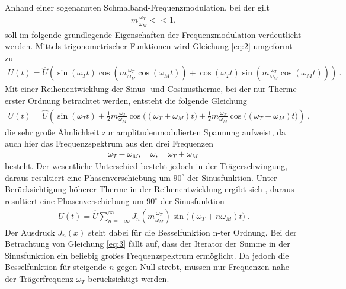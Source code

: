 Anhand einer sogenannten Schmalband-Frequenzmodulation, bei der gilt 
\begin{align}
	m\frac{\omega_T}{\omega_M}<<1,
\end{align}
soll im folgende grundlegende Eigenschaften der Frequenzmodulation verdeutlicht werden. Mittels trigonometrischer Funktionen wird Gleichung \eqref{eq:2} umgeformt zu
\begin{align}
	U(t)=\hat{U}\left(\sin{(\omega_Tt)}\cos{\left(m\frac{\omega_T}{\omega_M}\cos{(\omega_Mt)}\right)} + \cos{(\omega_Tt)}\sin{\left(m\frac{\omega_T}{\omega_M}\cos{(\omega_Mt)}\right)}\right) \:.
\end{align}
Mit einer Reihenentwicklung der Sinus- und Cosinustherme, bei der nur Therme erster Ordnung betrachtet werden, entsteht die folgende Gleichung
\begin{align}
	U(t)=\hat{U}\left(\sin{(\omega_Tt)+\frac{1}{2}m\frac{\omega_T}{\omega_M}\cos{\big((\omega_T+\omega_M)t\big)}}+\frac{1}{2}m\frac{\omega_T}{\omega_M}\cos{\big((\omega_T-\omega_M)t\big)}\right)\;,
\end{align}
die sehr große Ähnlichkeit zur amplitudenmodulierten Spannung aufweist, da auch hier das Frequenzspektrum aus den drei Frequenzen
\begin{align}
	\omega_T-\omega_M,\quad\omega,\quad\omega_T+\omega_M\;
\end{align}
besteht. Der wesentliche Unterschied besteht jedoch in der Trägerschwingung, daraus resultiert eine Phasenverschiebung um $90^{\circ}$ der Sinusfunktion.
Unter Berücksichtigung höherer Therme in der Reihenentwicklung ergibt sich 
, daraus resultiert eine Phasenverschiebung um $90^{\circ}$ der Sinusfunktion
\begin{align}
	U(t)=\hat{U}\sum_{n=-\infty}^{\infty} J_n\left(m\frac{\omega_T}{\omega_M}\right)\sin{\big((\omega_T+n\omega_M)t\big)}\;. 
	\label{eq:3}
\end{align}
Der Ausdruck $J_n(x)$ steht dabei für die Besselfunktion n-ter Ordnung. Bei der Betrachtung von Gleichung \eqref{eq:3} fällt auf, dass der Iterator der Summe in der Sinusfunktion ein beliebig großes Frequenzspektrum ermöglicht. Da jedoch die Besselfunktion für steigende $n$ gegen Null strebt, müssen nur Frequenzen nahe der Trägerfrequenz $\omega_T$ berücksichtigt werden.


